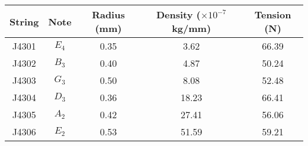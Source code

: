 \begin{tabular}{ccccc}
\toprule
String &   Note &  Radius (mm) &  Density ($\times 10^{-7}$ kg/mm) &  Tension (N) \\
\midrule
 J4301 &  $E_4$ &         0.35 &                              3.62 &        66.39 \\
 J4302 &  $B_3$ &         0.40 &                              4.87 &        50.24 \\
 J4303 &  $G_3$ &         0.50 &                              8.08 &        52.48 \\
 J4304 &  $D_3$ &         0.36 &                             18.23 &        66.41 \\
 J4305 &  $A_2$ &         0.42 &                             27.41 &        56.06 \\
 J4306 &  $E_2$ &         0.53 &                             51.59 &        59.21 \\
\bottomrule
\end{tabular}

